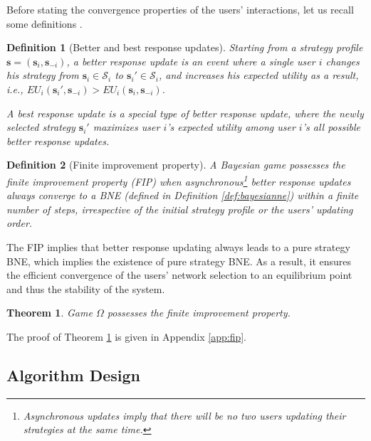 \documentclass[journal]{IEEEtran}
\newtheorem{theorem}{Theorem}
\newtheorem{definition}{Definition}
\begin{document}
 Before stating the convergence properties of the users' interactions, let us recall some definitions \cite{vocking_cg06}.
 

\begin{definition}[Better and best response updates]
   Starting from a strategy profile $\boldsymbol{s} = (\boldsymbol{s}_i, \boldsymbol{s}_{-i})$, a \emph{better response update} is an event where a single user $i$ changes his strategy from $\boldsymbol{s}_i \in \mathcal{S}_i$ to $\boldsymbol{s}_i' \in \mathcal{S}_i$, and increases his expected utility as a result, i.e., $EU_i(\boldsymbol{s}_i', \boldsymbol{s}_{-i}) > EU_i(\boldsymbol{s}_i, \boldsymbol{s}_{-i})$.

   A \emph{best response update} is a special type of better response update, where the newly selected strategy $\boldsymbol{s}_i'$ maximizes user $i$'s expected utility among user $i$'s all possible better response updates. 
\end{definition}


\begin{definition}[Finite improvement property] \label{def:FIP}  
   A Bayesian game possesses the \emph{finite improvement property} (FIP) when asynchronous\footnote{Asynchronous updates imply that there will be no two users updating their strategies at the same time.} better response updates always converge to a BNE (defined in Definition \ref{def:bayesianne}) within a finite number of steps, irrespective of the initial strategy profile or the users' updating order.
\end{definition}

 The FIP implies that better response updating always leads to a pure strategy BNE, which implies the existence of pure strategy BNE.
 As a result, it ensures the efficient convergence of the users' network selection to an equilibrium point and thus the stability of the system.

\begin{theorem} \label{thm:fip}
  Game $\Omega$ possesses the finite improvement property.
\end{theorem}


  The proof of Theorem \ref{thm:fip} is given in Appendix \ref{app:fip}.

	



\subsection{Algorithm Design} \label{sec:algo}
\end{document}
